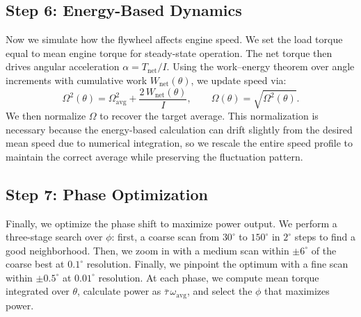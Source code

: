 \documentclass[12pt]{article}
\begin{document}
\subsection{Step 6: Energy-Based Dynamics}
Now we simulate how the flywheel affects engine speed. We set the load torque equal to mean engine torque for steady-state operation. The net torque then drives angular acceleration \(\alpha = T_{\text{net}}/I\). Using the work--energy theorem over angle increments with cumulative work \(W_{\text{net}}(\theta)\), we update speed via:
\begin{equation}
  \Omega^{2}(\theta) = \Omega_{\!\text{avg}}^{2} + \frac{2\,W_{\text{net}}(\theta)}{I},\qquad \Omega(\theta) = \sqrt{\Omega^{2}(\theta)}.
\end{equation}
We then normalize \(\Omega\) to recover the target average. This normalization is necessary because the energy-based calculation can drift slightly from the desired mean speed due to numerical integration, so we rescale the entire speed profile to maintain the correct average while preserving the fluctuation pattern.

\subsection{Step 7: Phase Optimization}
Finally, we optimize the phase shift to maximize power output. We perform a three-stage search over \(\phi\): first, a coarse scan from \(30^{\circ}\) to \(150^{\circ}\) in \(2^{\circ}\) steps to find a good neighborhood. Then, we zoom in with a medium scan within \(\pm6^{\circ}\) of the coarse best at \(0.1^{\circ}\) resolution. Finally, we pinpoint the optimum with a fine scan within \(\pm0.5^{\circ}\) at \(0.01^{\circ}\) resolution. At each phase, we compute mean torque integrated over \(\theta\), calculate power as \(\bar{\tau}\,\omega_{\!\text{avg}}\), and select the \(\phi\) that maximizes power.
\end{document}
